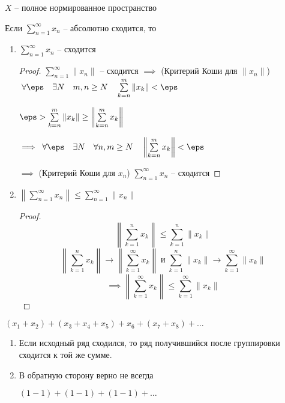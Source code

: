 \begin{theorem} \thmslashn 

	$X$ -- полное нормированное пространство

	Если $\sum\limits_{n=1}^{\infty}x_n$ -- абсолютно сходится, то
	\begin{enumerate}
		\item $\sum\limits_{n=1}^{\infty}x_n$ -- сходится 
		
		\begin{proof} \thmslashn 

			$\sum\limits_{n=1}^{\infty}\|x_n\|$ -- сходится $\implies$ (Критерий Коши для $\|x_n\|$) $\;\forall{\eps}\quad \exists{N} \quad m,n\ge N \quad \sum\limits_{k=n}^{m}\|x_k\|< \eps$

			$\eps > \sum\limits_{k=n}^{m}\|x_k\| \ge \left\|\sum\limits_{k=n}^{m}x_k\right\|$
	
			$\implies\; \forall{\eps} \quad \exists{N} \quad \forall{n,m \ge N}\quad \left\|\sum\limits_{k=n}^{m}x_k\right\| < \eps$
			
			$\implies$ (Критерий Коши для $x_n$) $\sum\limits_{n=1}^{\infty}x_n$ -- сходится
		\end{proof}

		\item $\left\|\sum\limits_{n=1}^{\infty}x_n\right\| \le \sum\limits_{n=1}^{\infty}\|x_n\|$
		
		\begin{proof} \thmslashn 
			\[
				\left\|\sum\limits_{k = 1}^{n}x_k\right\| \le \sum\limits_{k = 1}^{n}\|x_k\|
			\]
			\[
				\left\|\sum\limits_{k = 1}^{n}x_k\right\| \to \left\|\sum\limits_{k = 1}^{\infty}x_k\right\|\;\text{и}\;\sum\limits_{k = 1}^{n}\|x_k\|\to\sum\limits_{k = 1}^{\infty}\|x_k\|
			\]
			\[
				\implies \left\|\sum\limits_{k = 1}^{\infty}x_k\right\| \le \sum\limits_{k = 1}^{\infty}\|x_k\|
			\]
		\end{proof}
	\end{enumerate} 
\end{theorem}

\begin{definition} \thmslashn 

	$(x_1 + x_2) + (x_3 + x_4 + x_5) + x_6 + (x_7 + x_8)+\ldots$
\end{definition}

\begin{remark}\thmslashn

	\begin{enumerate}
		\item Если исходный ряд сходился, то ряд получившийся после группировки сходится к той же сумме.
		\item В обратную сторону верно не всегда
		\begin{example}
			$(1 - 1)+(1- 1) + (1-1)+\ldots$
		\end{example}
	\end{enumerate}
\end{remark}

